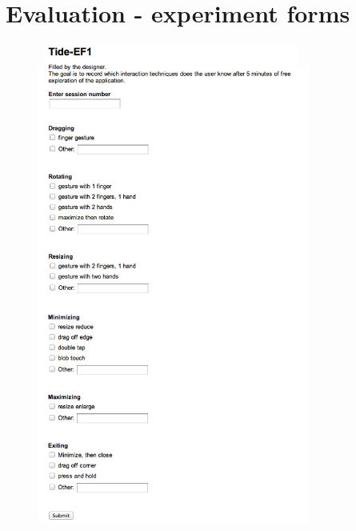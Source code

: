 \chapter{Evaluation - experiment forms}
\label{app:evalforms}

\begin{figure}[htb]
  \centering
    \includegraphics[width=0.8\textwidth]{images/evalform1}
\end{figure}

